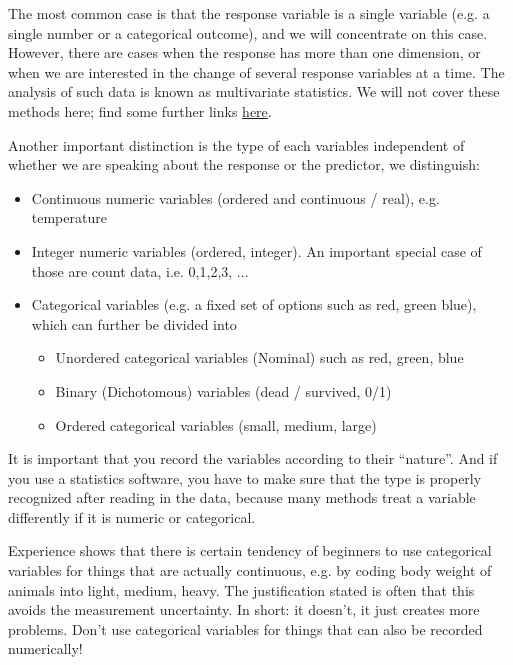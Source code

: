 \documentclass[a4paper,twoside]{tufte-book}\usepackage[]{graphicx}\usepackage[]{color}
\begin{document}
The most common case is that the response variable is a single variable (e.g. a single number or a categorical outcome), and we will concentrate on this case. However, there are cases when the response has more than one dimension, or when we are interested in the change of several response variables at a time. The analysis of such data is known as multivariate statistics. We will not cover these methods here; find some further links \href{http://biometry.github.io/APES/Stats/stats50-MultivariateStatistics.html}{here}.

Another important distinction is the type of each variables independent of whether we are speaking about the response or the predictor, we distinguish: 

\begin{itemize}
\item Continuous numeric variables (ordered and continuous / real), e.g. temperature
\item Integer numeric variables (ordered, integer). An important special case of those are count data, i.e. 0,1,2,3, ...
\item Categorical variables (e.g. a fixed set of options such as red, green blue), which can further be divided into
\begin{itemize}
\item Unordered categorical variables (Nominal) such as red, green, blue 
\item Binary (Dichotomous) variables (dead / survived, 0/1)
\item Ordered categorical variables (small, medium, large)
\end{itemize}
\end{itemize}

It is important that you record the variables according to their ``nature''. And if you use a statistics software, you have to make sure that the type is properly recognized after reading in the data, because many methods treat a variable differently if it is numeric or categorical.

Experience shows that there is certain tendency of beginners to use categorical variables for things that are actually continuous, e.g. by coding body weight of animals into light, medium, heavy. The justification stated is often that this avoids the measurement uncertainty. In short: it doesn't, it just creates more problems. Don't use categorical variables for things that can also be recorded numerically! 
\end{document}
